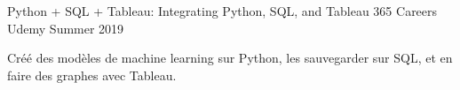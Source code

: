 \begin{cventries}

\cventry
{Python + SQL + Tableau: Integrating Python, SQL, and Tableau} %
{365 Careers} %
{Udemy} %
{Summer 2019} %
{ %
\begin{cvitems}
\item {Créé des modèles de machine learning sur Python, les sauvegarder sur SQL, et en faire des graphes avec Tableau.}
\end{cvitems}
}






\end{cventries}
